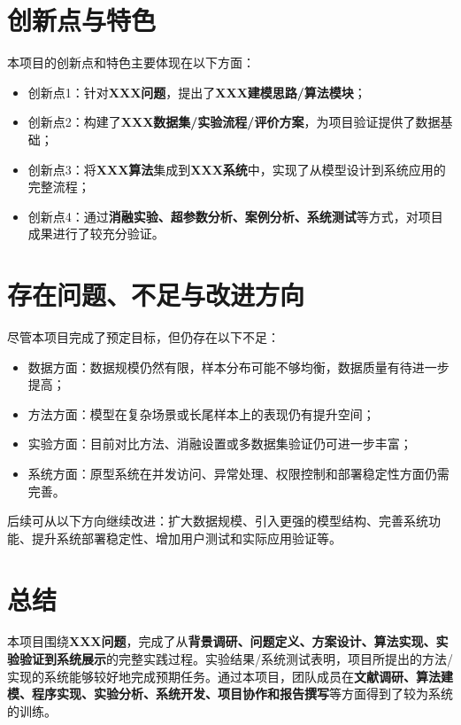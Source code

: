 \documentclass{style/course-report}
\begin{document}
\section{创新点与特色}

本项目的创新点和特色主要体现在以下方面：
\begin{itemize}
    \item 创新点1：针对\textbf{XXX问题}，提出了\textbf{XXX建模思路/算法模块}；
    \item 创新点2：构建了\textbf{XXX数据集/实验流程/评价方案}，为项目验证提供了数据基础；
    \item 创新点3：将\textbf{XXX算法}集成到\textbf{XXX系统}中，实现了从模型设计到系统应用的完整流程；
    \item 创新点4：通过\textbf{消融实验、超参数分析、案例分析、系统测试}等方式，对项目成果进行了较充分验证。
\end{itemize}



\section{存在问题、不足与改进方向}

尽管本项目完成了预定目标，但仍存在以下不足：
\begin{itemize}
    \item 数据方面：数据规模仍然有限，样本分布可能不够均衡，数据质量有待进一步提高；
    \item 方法方面：模型在复杂场景或长尾样本上的表现仍有提升空间；
    \item 实验方面：目前对比方法、消融设置或多数据集验证仍可进一步丰富；
    \item 系统方面：原型系统在并发访问、异常处理、权限控制和部署稳定性方面仍需完善。
\end{itemize}

后续可从以下方向继续改进：扩大数据规模、引入更强的模型结构、完善系统功能、提升系统部署稳定性、增加用户测试和实际应用验证等。

\section{总结}

本项目围绕\textbf{XXX问题}，完成了从\textbf{背景调研、问题定义、方案设计、算法实现、实验验证到系统展示}的完整实践过程。实验结果/系统测试表明，项目所提出的方法/实现的系统能够较好地完成预期任务。通过本项目，团队成员在\textbf{文献调研、算法建模、程序实现、实验分析、系统开发、项目协作和报告撰写}等方面得到了较为系统的训练。
\end{document}
